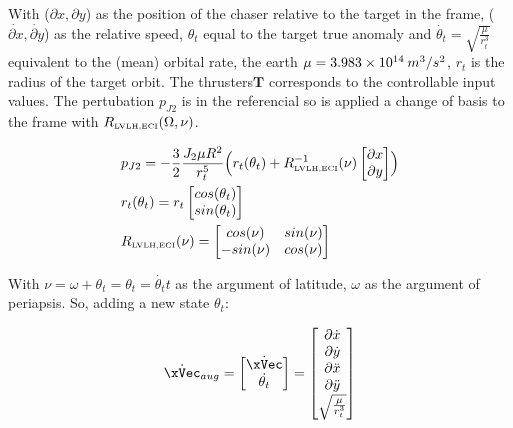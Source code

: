 With (\( \partial x, \partial y\)) as the position of the chaser relative to the target in the  frame, (\(\dot{\partial x}, \dot{\partial y}\)) as the relative speed, \(\theta_t\) equal to the target true anomaly and \(\dot{\theta_t} = \sqrt{\frac{\mu}{r_t^3}}\) equivalent to the (mean) orbital rate, the earth \(\mu = 3.983 \times 10^{14} \hspace{0.2em} m^3/s^2\), \(r_t\) is the radius of the target orbit. The thrusters\(\mathbf{T}\) corresponds to the controllable input  values. The pertubation \(p_{J2}\) is in the  referencial so is applied a change of basis to the  frame with \(R_{\text{\tiny LVLH,ECI}}(\Omega,\nu)\).

\begin{align}
  &p_{J2} = -\frac{3}{2} \frac{J_2 \mu R^2}{r_t^5}\Bigl(r_{t}(\theta_t)+ R^{-1}_{\text{\tiny LVLH,ECI}}(\nu) \begin{bmatrix}\partial x \\ \partial y\end{bmatrix}\Bigr) \label{eq:J2_peturbation} \\
  &r_t(\theta_t) = r_t\begin{bmatrix} cos(\theta_t) \\ sin(\theta_t)\end{bmatrix}\label{eq:circular_kepler_orbit_position} \\
  &R_{\text{\tiny LVLH,ECI}}(\nu) = \begin{bmatrix}
    cos(\nu) & sin(\nu) \\ -sin(\nu) & cos(\nu)
   \end{bmatrix}
  \label{eq:LVLH_ECI_2D_Rotation_Matrix}
\end{align}

With \(\nu = \omega + \theta_t = \theta_t = \dot{\theta_t} t \) as the argument of latitude, \(\omega\) as the argument of periapsis. So, adding a new state \(\theta_t\):


\begin{equation}
  \dot{\xVec}_{aug} = \begin{bmatrix} \dot{\xVec} \\  \dot{\theta_t} \end{bmatrix} = \begin{bmatrix}
  \partial \dot{x} \\ \partial \dot{y} \\  \partial\ddot{ x } \\ \partial\ddot{ y} \\ \sqrt{\frac{\mu}{r_t^3}} 
  \end{bmatrix} 
  \label{eq:orbital_dynamics_augmented}
\end{equation}


